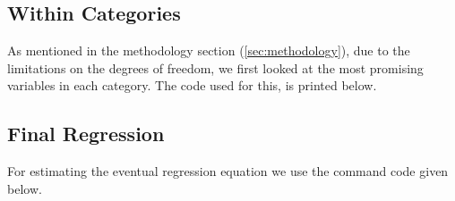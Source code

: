 \documentclass[twoside,12pt]{report}
\begin{document}
\subsection{Within Categories}
As mentioned in the methodology section (\cref{sec:methodology}), due to the limitations on the degrees of freedom, we first looked at the most promising variables in each category. The code used for this, is printed below.


\subsection{Final Regression}
For estimating the eventual regression equation we use the command code given below.

\end{document}
